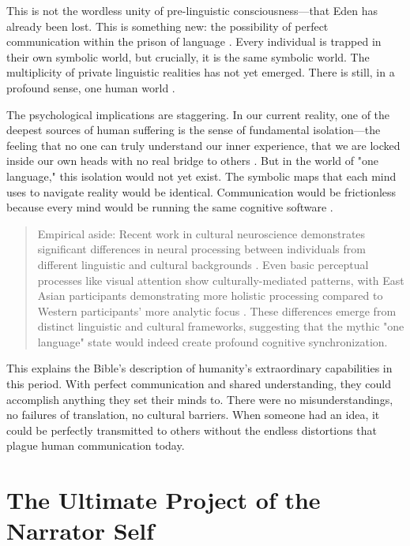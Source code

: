 This is not the wordless unity of pre-linguistic consciousness—that Eden has already been lost. This is something new: the possibility of perfect communication within the prison of language \parencite{deacon1997symbolic}. Every individual is trapped in their own symbolic world, but crucially, it is the same symbolic world. The multiplicity of private linguistic realities has not yet emerged. There is still, in a profound sense, one human world \parencite{searle1995construction}.

The psychological implications are staggering. In our current reality, one of the deepest sources of human suffering is the sense of fundamental isolation—the feeling that no one can truly understand our inner experience, that we are locked inside our own heads with no real bridge to others \parencite{cacioppo2008loneliness}. But in the world of "one language," this isolation would not yet exist. The symbolic maps that each mind uses to navigate reality would be identical. Communication would be frictionless because every mind would be running the same cognitive software \parencite{hutchins1995cognition}.

\begin{quote}\small
Empirical aside: Recent work in cultural neuroscience demonstrates significant differences in neural processing between individuals from different linguistic and cultural backgrounds \parencite{han2013cultural}. Even basic perceptual processes like visual attention show culturally-mediated patterns, with East Asian participants demonstrating more holistic processing compared to Western participants' more analytic focus \parencite{nisbett2001culture}. These differences emerge from distinct linguistic and cultural frameworks, suggesting that the mythic "one language" state would indeed create profound cognitive synchronization.
\end{quote}

This explains the Bible's description of humanity's extraordinary capabilities in this period. With perfect communication and shared understanding, they could accomplish anything they set their minds to. There were no misunderstandings, no failures of translation, no cultural barriers. When someone had an idea, it could be perfectly transmitted to others without the endless distortions that plague human communication today.

\section{The Ultimate Project of the Narrator Self}

